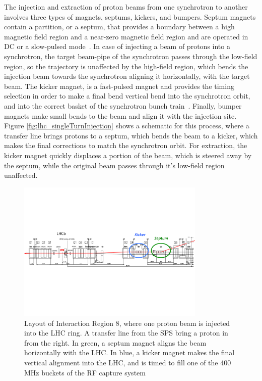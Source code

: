 \par The injection and extraction of proton beams from one synchrotron
to another involves three types of magnets, septums, kickers, and
bumpers.  Septum magnets contain a partition, or a septum, that
provides a boundary between a high magnetic field region and a
near-zero magnetic field region and are operated in DC or a
slow-pulsed mode~\cite{LHC:LHC_septums_Barnes}.  In case of injecting
a beam of protons into a synchrotron, the target beam-pipe of the synchrotron
passes through the low-field region, so the trajectory is unaffected
by the high-field region, which bends the injection beam towards the
synchrotron aligning it horizontally, with the target beam.  The
kicker magnet, is a fast-pulsed magnet and provides the timing
selection in order to make a final bend vertical bend into the
synchrotron orbit, and into the correct basket of the synchrotron bunch 
train~\cite{LHC:LHC_kickers_Barnes}.  Finally, bumper magnets make
small bends to the beam and align it with the injection site.  Figure
\ref{fig:lhc_singleTurnInjection} shows a schematic for this process,
where a transfer line brings protons to a septum, which bends the beam
to a kicker, which makes the final corrections to match the
synchrotron orbit.  For extraction, the kicker magnet quickly
displaces a portion of the beam, which is steered away by the septum,
while the original beam passes through it's low-field region 
unaffected.   

\begin{figure}[h]
   \centering
  \includegraphics[width=0.8\textwidth]{Figures/LHC_Diagrams/LHC_IR8-layout.pdf}
  \caption{Layout of Interaction Region 8, where one proton beam is
    injected into the LHC ring.  A transfer line from the SPS bring a
    proton in from the right.  In green, a septum magnet aligns the
    beam horizontally with the LHC.  In blue, a kicker magnet makes
    the final vertical alignment into the LHC, and is timed to fill
    one of the 400 MHz buckets of the RF capture
    system \cite{lhc:machine_description}} \label{fig:lhc_IR8_layout}
\end{figure}

